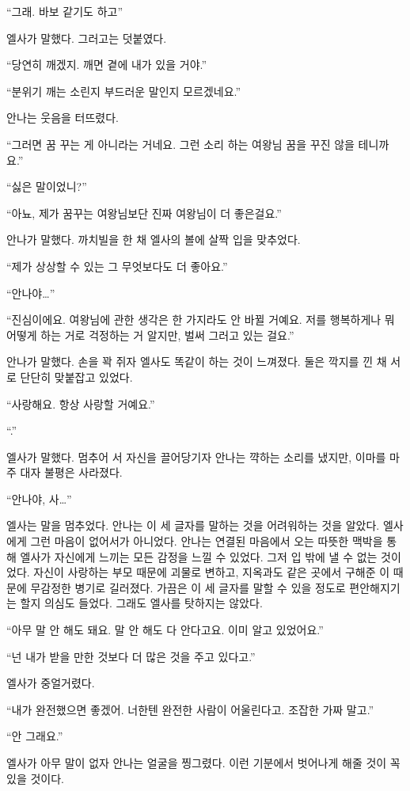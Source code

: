 ``그래. 바보 같기도 하고''

엘사가 말했다. 그러고는 덧붙였다.

``당연히 깨겠지. 깨면 곁에 내가 있을 거야.''

``분위기 깨는 소린지 부드러운 말인지 모르겠네요.''

안나는 웃음을 터뜨렸다.

``그러면 꿈 꾸는 게 아니라는 거네요. 그런 소리 하는 여왕님 꿈을 꾸진 않을 테니까요.''

`` 싫은 말이었니?''

``아뇨, 제가 꿈꾸는 여왕님보단 진짜 여왕님이 더 좋은걸요.''

안나가 말했다. 까치빌을 한 채 엘사의 볼에 살짝 입을 맞추었다.

``제가 상상할 수 있는 그 무엇보다도 더 좋아요.''

``안나야\ldots''

``진심이에요. 여왕님에 관한 생각은 한 가지라도 안 바뀔 거예요. 저를 행복하게나 뭐 어떻게 하는 거로 걱정하는 거 알지만, 벌써 그러고 있는 걸요.''

안나가 말했다. 손을 꽉 쥐자 엘사도 똑같이 하는 것이 느껴졌다. 둘은 깍지를 낀 채 서로 단단히 맞붙잡고 있었다.

``사랑해요. 항상 사랑할 거예요.''

``.''

엘사가 말했다. 멈추어 서 자신을 끌어당기자 안나는 꺅하는 소리를 냈지만, 이마를 마주 대자 불평은 사라졌다.

``안나야, 사\ldots''

엘사는 말을 멈추었다. 안나는 이 세 글자를 말하는 것을 어려워하는 것을 알았다. 엘사에게 그런 마음이 없어서가 아니었다. 안나는 연결된 마음에서 오는 따뜻한 맥박을 통해 엘사가 자신에게 느끼는 모든 감정을 느낄 수 있었다. 그저 입 밖에 낼 수 없는 것이었다. 자신이 사랑하는 부모 때문에 괴물로 변하고, 지옥과도 같은 곳에서 구해준 이 때문에 무감정한 병기로 길러졌다. 가끔은 이 세 글자를 말할 수 있을 정도로 편안해지기는 할지 의심도 들었다. 그래도 엘사를 탓하지는 않았다.

``아무 말 안 해도 돼요. 말 안 해도 다 안다고요. 이미 알고 있었어요.''

``넌 내가 받을 만한 것보다 더 많은 것을 주고 있다고.''

엘사가 중얼거렸다.

``내가 완전했으면 좋겠어. 너한텐 완전한 사람이 어울린다고. 조잡한 가짜 말고.''

``안 그래요.''

엘사가 아무 말이 없자 안나는 얼굴을 찡그렸다. 이런 기분에서 벗어나게 해줄 것이 꼭 있을 것이다.

